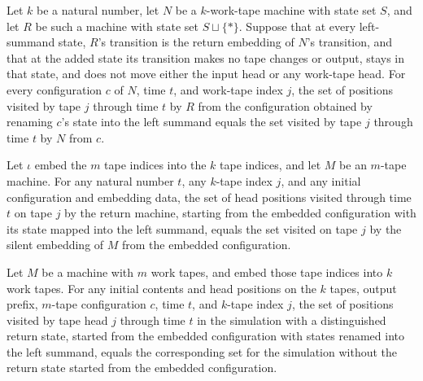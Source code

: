 \begin{lemma}
\label{Turing.embedReturn_visited}
\leanok
{}
Let $k$ be a natural number, let $N$ be a $k$-work-tape machine with state set $S$, and
let $R$ be such a machine with state set $S \sqcup \{\ast\}$. Suppose that at every
left-summand state, $R$'s transition is the return embedding of $N$'s transition, and
that at the added state its transition makes no tape changes or output, stays in that
state, and does not move either the input head or any work-tape head. For every
configuration $c$ of $N$, time $t$, and work-tape index $j$, the set of positions
visited by tape $j$ through time $t$ by $R$ from the configuration obtained by renaming
$c$'s state into the left summand equals the set visited by tape $j$ through time $t$ by
$N$ from $c$.
\end{lemma}

\begin{theorem}
\label{Turing.embedSilentRetTM_visitedByTapeHead}
\leanok
{}
Let $\iota$ embed the $m$ tape indices into the $k$ tape indices, and let $M$ be an
$m$-tape machine. For any natural number $t$, any $k$-tape index $j$, and any initial
configuration and embedding data, the set of head positions visited through time $t$ on
tape $j$ by the return machine, starting from the embedded configuration with its state
mapped into the left summand, equals the set visited on tape $j$ by the silent embedding
of $M$ from the embedded configuration.
\end{theorem}

\begin{theorem}
\label{Turing.embedEmitRetTM_visitedByTapeHead}
\leanok
{}
Let $M$ be a machine with $m$ work tapes, and embed those tape indices into $k$ work
tapes. For any initial contents and head positions on the $k$ tapes, output prefix,
$m$-tape configuration $c$, time $t$, and $k$-tape index $j$, the set of positions
visited by tape head $j$ through time $t$ in the simulation with a distinguished return
state, started from the embedded configuration with states renamed into the left
summand, equals the corresponding set for the simulation without the return state
started from the embedded configuration.
\end{theorem}

